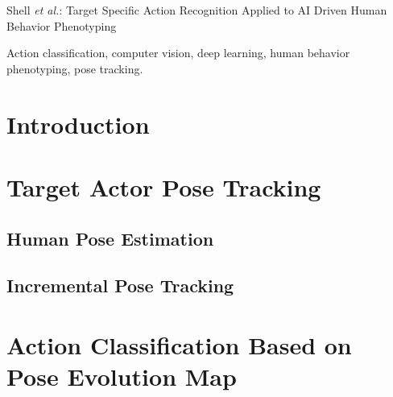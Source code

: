 \documentclass[sensors,article,submit,moreauthors,pdftex]{Definitions/mdpi}
\begin{document}
%
{Shell \MakeLowercase{\textit{et al.}}: Target Specific Action Recognition Applied to AI Driven Human Behavior Phenotyping} %
\maketitle

\begin{abstract}

\end{abstract}

\begin{IEEEkeywords}
Action classification, computer vision, deep learning, human behavior phenotyping, pose tracking.
\end{IEEEkeywords}
%
\IEEEpeerreviewmaketitle
\section{Introduction}

\section{Target Actor Pose Tracking}
\label{sec:PoseTrack}

\subsection{Human Pose Estimation}
\label{sec:PoseEst}

\subsection{Incremental Pose Tracking}
\label{sec:track}

\section{Action Classification Based on Pose Evolution Map}
\label{sec:action}

\end{document}
